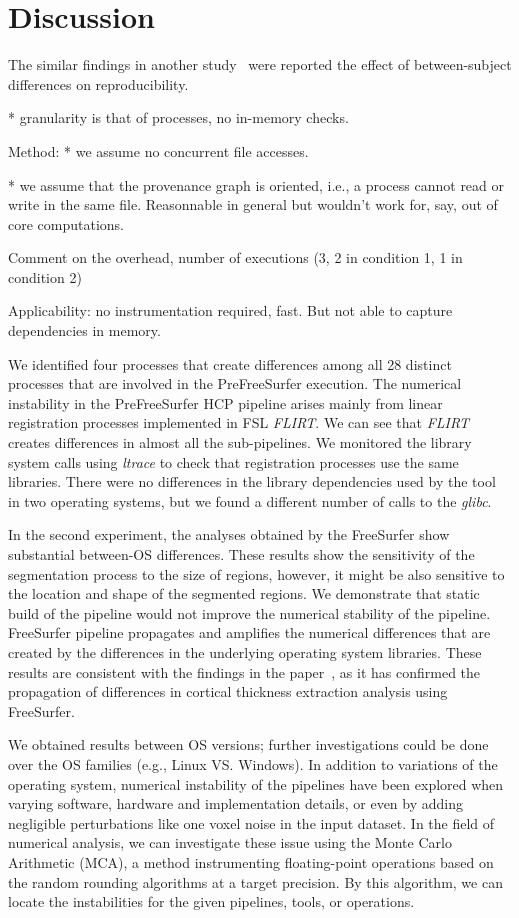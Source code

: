 \documentclass[a4paper,num-refs]{oup-contemporary}
\begin{document}
\section{Discussion}


  The similar findings in another study~\cite{bowring2019exploring} were reported 
  the effect of between-subject differences on reproducibility.

* granularity is that
 of processes, no in-memory checks.

Method:
* we assume no concurrent file accesses.

* we assume that the provenance graph is oriented, i.e., a process cannot read or write in the same file. Reasonnable in general but wouldn't work 
for, say, out of core computations.

Comment on the overhead, number of executions (3, 2 in condition 1, 1 in condition 2)

Applicability: no instrumentation required, fast.
But not able to capture dependencies in memory.

We identified four processes that create differences 
among all 28 distinct processes that are involved in the PreFreeSurfer execution. 
The numerical instability in the 
PreFreeSurfer HCP pipeline arises mainly from linear 
registration processes implemented in FSL \emph{FLIRT}. 
We can see that \emph{FLIRT} creates differences in almost all the sub-pipelines. 
We monitored the library system calls using \emph{ltrace} to check that registration processes
use the same libraries. There were no differences in the library dependencies used by 
the tool in two operating systems, but we found a different number of calls to the \emph{glibc}.

In the second experiment, 
the analyses obtained by the FreeSurfer show substantial between-OS differences.
These results show the sensitivity of the segmentation process to the 
size of regions, however, it might be also sensitive to the location and shape of 
the segmented regions.
We demonstrate that static build of the pipeline would not improve the numerical stability of the pipeline. 
FreeSurfer pipeline propagates and amplifies the numerical differences that are created by the 
differences in the underlying operating system libraries.
These results are consistent with the findings in the paper~\cite{Glatard2015}, 
as it has confirmed the propagation of differences in cortical thickness extraction analysis using FreeSurfer.

We obtained results between OS versions; further investigations could be done over the OS families (e.g., Linux VS. Windows).
In addition to variations of the operating system, numerical instability of the pipelines have been 
explored when varying software, hardware and implementation details, or even by adding negligible 
perturbations like one voxel noise in the input dataset.
In the field of numerical analysis, we can investigate these issue using the Monte Carlo Arithmetic (MCA), 
a method instrumenting floating-point operations based on the random rounding algorithms at a target precision.
By this algorithm, we can locate the instabilities for the given pipelines, tools, or operations.
\end{document}
